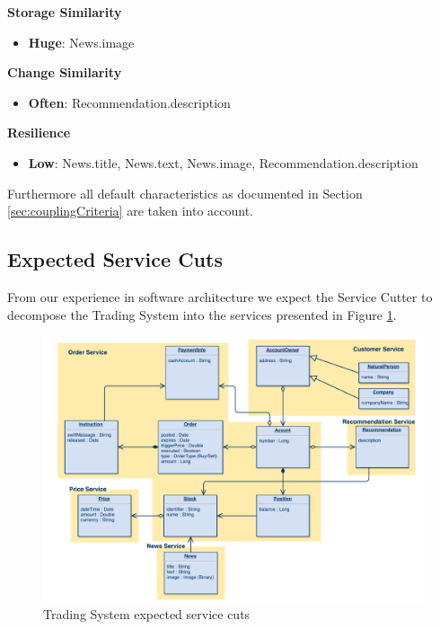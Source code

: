 \textbf{Storage Similarity}

\begin{itemize}
\item \textbf{Huge}: News.image
\end{itemize}

\textbf{Change Similarity}

\begin{itemize}
\item \textbf{Often}: Recommendation.description
\end{itemize}

\textbf{Resilience}

\begin{itemize}
\item \textbf{Low}: News.title, News.text, News.image, Recommendation.description
\end{itemize}

Furthermore all default characteristics as documented in Section \ref{sec:couplingCriteria} are taken into account.

\subsection{Expected Service Cuts}

From our experience in software architecture we expect the Service Cutter to decompose the Trading System into the services presented in Figure \ref{fig:tradingCuts}.

\begin{figure}[H]
	\includegraphics[scale=0.5]{diagrams/TradingSystem-ServiceCut.pdf}
	\caption{Trading System expected service cuts}
	\label{fig:tradingCuts}
\end{figure}

